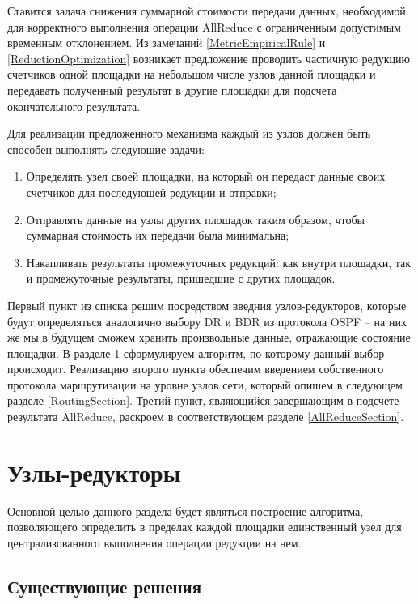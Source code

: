 \documentclass{article}
\theoremstyle{plain}
\theoremstyle{plain}
\theoremstyle{plain}
\theoremstyle{plain}
\theoremstyle{definition}
\theoremstyle{remark}
\theoremstyle{plain}
\begin{document}
Ставится задача снижения суммарной стоимости передачи данных, необходимой для корректного выполнения операции AllReduce с ограниченным допустимым временным отклонением. Из замечаний \ref{MetricEmpiricalRule} и \ref{ReductionOptimization} возникает предложение проводить частичную редукцию счетчиков одной площадки на небольшом числе узлов данной площадки и передавать полученный результат в другие площадки для подсчета окончательного результата.

Для реализации предложенного механизма каждый из узлов должен быть способен выполнять следующие задачи:

\begin{enumerate}
    \item Определять узел своей площадки, на который он передаст данные своих счетчиков для последующей редукции и отправки;
    
    \item Отправлять данные на узлы других площадок таким образом, чтобы суммарная стоимость их передачи была минимальна;
    
    \item Накапливать результаты промежуточных редукций: как внутри площадки, так и промежуточные результаты, пришедшие с других площадок.
\end{enumerate}

Первый пункт из списка решим посредством введния узлов-редукторов, которые будут определяться аналогично выбору DR и BDR из протокола OSPF \cite[стр.~75]{RFC2328} -- на них же мы в будущем сможем хранить произвольные данные, отражающие состояние площадки. В разделе \ref{ReducersSection} сформулируем алгоритм, по которому данный выбор происходит. Реализацию второго пункта обеспечим введением собственного протокола маршрутизации на уровне узлов сети, который опишем в следующем разделе \ref{RoutingSection}. Третий пункт, являющийся завершающим в подсчете результата AllReduce, раскроем в соответствующем разделе \ref{AllReduceSection}.

\section{Узлы-редукторы}
\label{ReducersSection}

Основной целью данного раздела будет являться построение алгоритма, позволяющего определить в пределах каждой площадки единственный узел для централизованного выполнения операции редукции на нем.

\subsection{Существующие решения}
\end{document}
